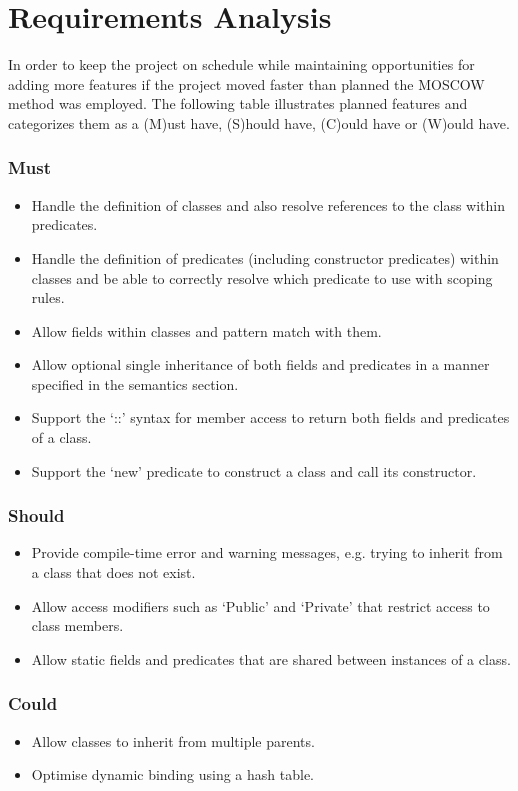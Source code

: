 \documentclass[12pt,a4paper,twoside,openright]{report}
\begin{document}
\section{Requirements Analysis}
\label{sec:req}
In order to keep the project on schedule while maintaining opportunities for adding more features if the project moved faster than planned the MOSCOW method was employed. The following table illustrates planned features and categorizes them as a (M)ust have, (S)hould have, (C)ould have or (W)ould have.

\subsubsection{Must}

\begin{itemize}
	\item Handle the definition of classes and also resolve references to the class within predicates.
	\item Handle the definition of predicates (including constructor predicates) within classes and be able to correctly resolve which predicate to use with scoping rules.
	\item Allow fields within classes and pattern match with them.
	\item Allow optional single inheritance of both fields and predicates in a manner specified in the semantics section.
	\item Support the `::' syntax for member access to return both fields and predicates of a class.
	\item Support the `new' predicate to construct a class and call its constructor.
\end{itemize}


\subsubsection{Should}
\begin{itemize}
	\item Provide compile-time error and warning messages, e.g. trying to inherit from a class that does not exist.
	\item Allow access modifiers such as `Public' and `Private' that restrict access to class members.
	\item Allow static fields and predicates that are shared between instances of a class.
\end{itemize}

\subsubsection{Could}
\begin{itemize}
	\item Allow classes to inherit from multiple parents.
	\item Optimise dynamic binding using a hash table.
\end{itemize}
\end{document}
